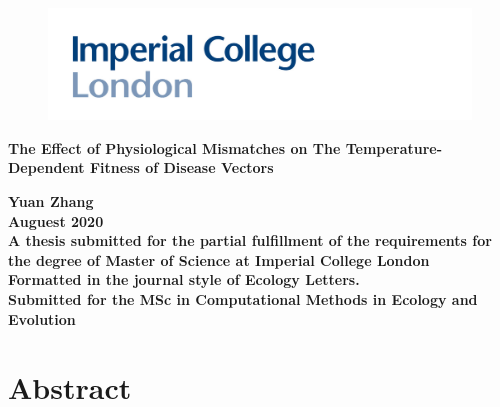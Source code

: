 \documentclass[11pt]{article}
\begin{document}
	
	\begin{titlepage}
		
		\begin{center}
			
			\begin{figure}[t]
				\centering
				\includegraphics[width = \textwidth]{../Materials/logo.jpg}
			\end{figure}
			
			\vspace{1cm}
			\Huge
			\textbf{The Effect of Physiological Mismatches on The Temperature-Dependent Fitness of Disease Vectors }\\
			
			\vspace{3cm}
			\Large
			
			\textbf{Yuan Zhang}\\   
			\textbf{Auguest 2020}\\
			
			
			
			
			\textbf{A thesis submitted for the partial fulfillment of the requirements for the degree of Master of Science at Imperial College London}\\
				
				
			\textbf{Formatted in the journal style of Ecology Letters.
}\\
			\textbf{Submitted for the MSc  in Computational Methods in Ecology and Evolution}\\
			\vspace*{2cm}	

			
			
		\end{center}
		
	\end{titlepage}
	
	\clearpage
	\tableofcontents
	
	
	\linenumbers %
	\doublespacing
	

\newpage

\section*{Abstract}
\end{document}
